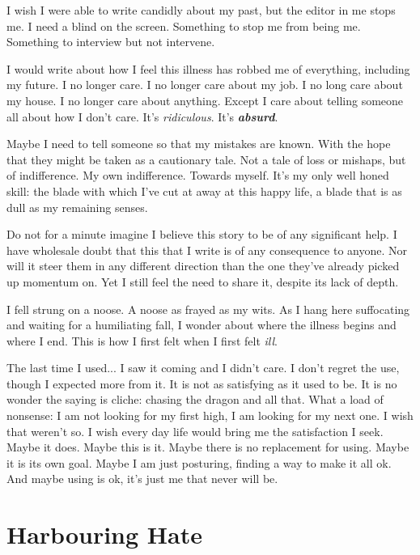 \documentclass[fontsize=12pt,english]{scrreprt}
\begin{document}
I wish I were able to write candidly about my past, but the editor in
me stops me. I need a blind on the screen. Something to stop me from
being me. Something to interview but not intervene.


I would write about how I feel this illness has robbed me of
everything, including my future. I no longer care. I no longer care
about my job. I no long care about my house. I no longer care about
anything. Except I care about telling someone all about how I don't
care. It's \textit{ridiculous}. It's \textbf{\textit{absurd}}.

Maybe I need to tell someone so that my mistakes are known. With the
hope that they might be taken as a cautionary tale. Not a tale of loss
or mishaps, but of indifference. My own indifference. Towards
myself. It's my only well honed skill: the blade with which I've cut
at away at this happy life, a blade that is as dull as my remaining
senses.

Do not for a minute imagine I believe this story to be of any
significant help. I have wholesale doubt that this that I write is of
any consequence to anyone.  Nor will it steer them in any different
direction than the one they've already picked up momentum on. Yet I
still feel the need to share it, despite its lack of depth.


I fell strung on a noose. A noose as frayed as my wits. As I hang here
suffocating and waiting for a humiliating fall, I wonder about where
the illness begins and where I end. This is how I first felt when I
first felt \textit{ill}.

The last time I used... I saw it coming and I didn't care. I don't
regret the use, though I expected more from it. It is not as
satisfying as it used to be. It is no wonder the saying is cliche:
chasing the dragon and all that. What a load of nonsense: I am not
looking for my first high, I am looking for my next one. I wish that
weren't so. I wish every day life would bring me the satisfaction I
seek. Maybe it does. Maybe this is it.  Maybe there is no replacement
for using. Maybe it is its own goal. Maybe I am just posturing,
finding a way to make it all ok. And maybe using is ok, it's just me
that never will be.

\newpage

\section{Harbouring Hate}
\end{document}
